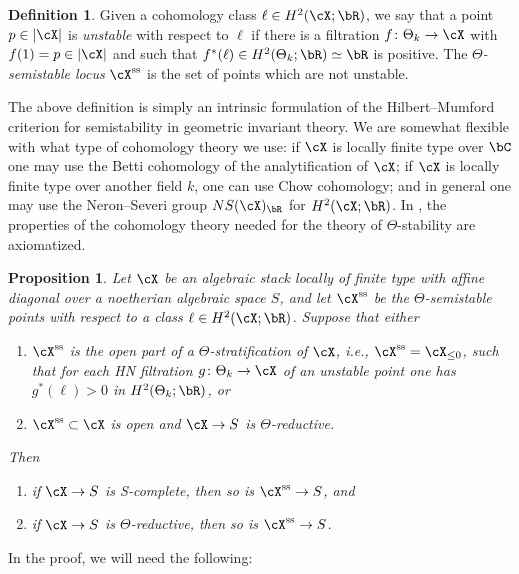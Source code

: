 \documentclass[a4paper]{amsart}
\numberwithin{equation}{section}
\theoremstyle{plain}
\newtheorem{prop}[thm]{Proposition}
\theoremstyle{definition}
\newtheorem{defn}[thm]{Definition}
\newcommand{\co}{\colon}
\renewcommand{\ss}{{\rm ss}}
\begin{document}
\begin{defn} \label{D:semistable-locus}
Given a cohomology class $\ell \in H^2(\cX;\bR)$, we say that a point $p \in |\cX|$ is \emph{unstable} with respect to $\ell$ if there is a filtration $f \co \Theta_k \to \cX$ with $f(1) = p \in |\cX|$ and such that $f^\ast(\ell) \in H^2(\Theta_k;\bR) \simeq \bR$ is positive. The \emph{$\Theta$-semistable locus} $\cX^{\ss}$ is the set of points which are not unstable. 
\end{defn}
The above definition is simply an intrinsic formulation of the Hilbert--Mumford criterion for semistability in geometric invariant theory.
We are somewhat flexible with what type of cohomology theory we use: if $\cX$ is locally finite type over $\bC$ one may use the Betti cohomology of the analytification of $\cX$; if $\cX$ is locally finite type over another field $k$, one can use Chow cohomology; and in general one may use the Neron--Severi group $NS(\cX)_\bR$ for $H^2(\cX;\bR)$. In \cite[\S 4.1.2]{hlinstability}, the properties of the cohomology theory needed for the theory of $\Theta$-stability are axiomatized.

\begin{prop}   \label{P:semistable_locus}
Let $\cX$ be an algebraic stack locally of finite type with affine diagonal over a noetherian algebraic space $S$, and let $\cX^{\ss}$ be the $\Theta$-semistable points with respect to a class $\ell \in H^2(\cX;\bR)$.  Suppose that either   
\begin{enumerate}[label=(\alph*)]
\item $\cX^{\ss}$ is the open part of a $\Theta$-stratification of $\cX$, i.e., $\cX^{\ss} = \cX_{\leq 0}$, such that for each HN filtration $g \co \Theta_k \to \cX$ of an unstable point one has $g^\ast(\ell) >0$ in $H^2(\Theta_k;\bR)$, or
\item $\cX^{\ss} \subset \cX$ is open and $\cX \to S$ is $\Theta$-reductive.
\end{enumerate}
Then
\begin{enumerate}
\item if $\cX \to S$ is  {\textsf{S}}-complete, then so is $\cX^{\ss} \to S$, and
\item if $\cX \to S$ is $\Theta$-reductive, then so is $\cX^{\ss} \to S$.
\end{enumerate}
\end{prop}



In the proof, we will need the following:
\end{document}

